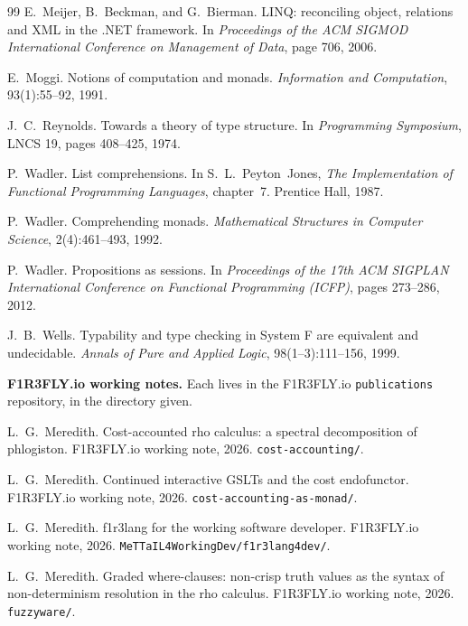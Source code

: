 \documentclass[11pt]{article}
\theoremstyle{branddef}
\theoremstyle{brandplain}
\theoremstyle{brandrem}
\newcommand{\flang}{\textsf{f1r3lang}}
\begin{document}
\begin{thebibliography}{99}
E.~Meijer, B.~Beckman, and G.~Bierman.
\newblock LINQ: reconciling object, relations and XML in the .NET framework.
\newblock In \emph{Proceedings of the ACM SIGMOD International Conference on
Management of Data}, page 706, 2006.

E.~Moggi.
\newblock Notions of computation and monads.
\newblock \emph{Information and Computation}, 93(1):55--92, 1991.

J.~C.~Reynolds.
\newblock Towards a theory of type structure.
\newblock In \emph{Programming Symposium}, LNCS 19, pages 408--425, 1974.

P.~Wadler.
\newblock List comprehensions.
\newblock In S.~L.~Peyton~Jones, \emph{The Implementation of Functional
Programming Languages}, chapter~7. Prentice Hall, 1987.

P.~Wadler.
\newblock Comprehending monads.
\newblock \emph{Mathematical Structures in Computer Science}, 2(4):461--493,
1992.

P.~Wadler.
\newblock Propositions as sessions.
\newblock In \emph{Proceedings of the 17th ACM SIGPLAN International Conference
on Functional Programming (ICFP)}, pages 273--286, 2012.

J.~B.~Wells.
\newblock Typability and type checking in System F are equivalent and
undecidable.
\newblock \emph{Annals of Pure and Applied Logic}, 98(1--3):111--156, 1999.

\bigskip
\noindent\textbf{F1R3FLY.io working notes.} Each lives in the F1R3FLY.io
\texttt{publications} repository, in the directory given.

L.~G.~Meredith.
\newblock Cost-accounted rho calculus: a spectral decomposition of phlogiston.
\newblock F1R3FLY.io working note, 2026. \texttt{cost-accounting/}.

L.~G.~Meredith.
\newblock Continued interactive GSLTs and the cost endofunctor.
\newblock F1R3FLY.io working note, 2026. \texttt{cost-accounting-as-monad/}.

L.~G.~Meredith.
\newblock \flang{} for the working software developer.
\newblock F1R3FLY.io working note, 2026.
\texttt{MeTTaIL4WorkingDev/f1r3lang4dev/}.

L.~G.~Meredith.
\newblock Graded where-clauses: non-crisp truth values as the syntax of
non-determinism resolution in the rho calculus.
\newblock F1R3FLY.io working note, 2026. \texttt{fuzzyware/}.


\end{thebibliography}
\end{document}
